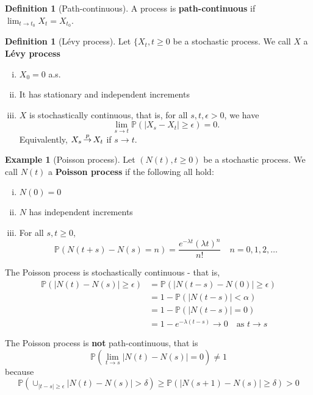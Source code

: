 \documentclass[10pt, oneside, reqno]{amsart}
\theoremstyle{plain}%
\theoremstyle{definition}
\newtheorem{defn}[thm]{Definition}
\newtheorem{exmp}[thm]{Example}
\theoremstyle{remark}
\renewcommand{\P}{\mathbb{P}}
\def\cip{\,{\buildrel p \over \rightarrow}\,}
\begin{document}
\begin{defn}[Path-continuous]
    A process is \textbf{path-continuous} if $\lim_{t \rightarrow t_0} X_t = X_{t_0}$.
\end{defn}

\begin{defn}[L\'evy process]
    Let $\{X_t, t \geq 0$ be a stochastic process.  We call $X$ a \textbf{L\'evy process}
    \begin{enumerate}[(i)]
        \item $X_0 = 0$ a.s.
        \item It has stationary and independent increments
        \item $X$ is stochastically continuous, that is, for all $s, t, \epsilon > 0$, we have \[
            \lim_{s \rightarrow t} \P(|X_s - X_t| \geq \epsilon) = 0.
        \]  Equivalently, $X_s \cip X_t$ if $s \rightarrow t$.
    \end{enumerate}
\end{defn}

\begin{exmp}[Poisson process]
    Let $(N(t), t \geq 0 )$ be a stochastic process.  We call $N(t)$ a \textbf{Poisson process} if the following all hold: 
    \begin{enumerate}[(i)]
        \item $N(0) = 0$
        \item $N$ has independent increments
        \item For all $s, t \geq 0$, \[
            \P(N(t+s)-N(s) = n) = \frac{e^{-\lambda t}(\lambda t)^n}{n!} \quad n = 0, 1, 2, \dots
        \]
    \end{enumerate}

    The Poisson process is stochastically continuous - that is,
    \begin{align*}
        \P( | N(t) - N(s) | \geq \epsilon)  &= \P(|N(t - s) - N(0) | \geq \epsilon) \\
                                            &= 1- \P(|N(t-s) | < \alpha ) \\
                                            &= 1 - \P(|N(t - s) | = 0 ) \\
                                            &= 1 - e^{-\lambda(t-s)} \rightarrow 0 \quad \text{as $t \rightarrow s$}
    \end{align*}
    
    The Poisson process is \textbf{not} path-continuous, that is \[
        \P( \lim_{t \rightarrow s} |N(t) - N(s)| = 0) \neq 1
    \] because \[
        \P( \displaystyle\cup_{|t-s| \geq \epsilon} |N(t) - N(s)| > \delta ) \geq \P(|N(s+1) - N(s) | \geq \delta ) > 0
    \]
\end{exmp}
\end{document}
